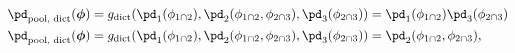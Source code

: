 \begin{align}
  \pd_{\text{pool, dict}} (\boldsymbol{\phi}) =
    g_{\text{dict}}(\pd_{1}(\phi_{1 \cap 2}), \pd_{2}(\phi_{1 \cap 2}, \phi_{2 \cap 3}), \pd_{3}(\phi_{2 \cap 3})) &=
    \pd_{1}(\phi_{1 \cap 2}) \pd_{3}(\phi_{2 \cap 3}) \label{eqn:dictatorial-pooling-one} \\
  \pd_{\text{pool, dict}} (\boldsymbol{\phi}) =
    g_{\text{dict}}(\pd_{1}(\phi_{1 \cap 2}), \pd_{2}(\phi_{1 \cap 2}, \phi_{2 \cap 3}), \pd_{3}(\phi_{2 \cap 3})) &=
    \pd_{2}(\phi_{1 \cap 2}, \phi_{2 \cap 3}), \label{eqn:dictatorial-pooling-two}
\end{align}